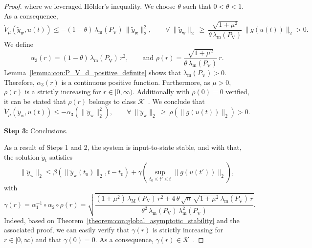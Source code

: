 \begin{proof}
    where we leveraged Hölder's inequality. We choose $\theta$ such that $0 < \theta < 1$.
    As a consequence,
    \begin{equation}
        \dot{V}_\mu(\tilde{y}_\mathrm{w}, u(t)) \leq -(1-\theta) \, \lambda_\mathrm{m}\left(P_{\dot{\mathrm{V}}} \right) \, \lVert \tilde{y}_\mathrm{w} \rVert_2^2, %
        \qquad
        \forall \: \lVert \tilde{y}_\mathrm{w} \rVert_2 \: \geq \: \frac{\sqrt{1+\mu^2}}{\theta \, \lambda_\mathrm{m}\left(P_{\dot{\mathrm{V}}} \right)} \, \lVert g(u(t)) \rVert_2  > 0.
    \end{equation}
    We define
    \begin{equation}
        \alpha_3(r) = (1-\theta) \, \lambda_\mathrm{m}\left(P_{\dot{\mathrm{V}}} \right) \, r^2,
        \qquad
        \text{and }
        \rho(r) = \frac{\sqrt{1+\mu^2}}{\theta \, \lambda_\mathrm{m}\left(P_{\dot{\mathrm{V}}} \right)} \, r.
    \end{equation}
    Lemma~\ref{lemma:con:P_V_d_positive_definite} shows that $\lambda_\mathrm{m}\left(P_{\dot{\mathrm{V}}} \right) > 0$. Therefore, $\alpha_3(r)$ is a continuous positive function. Furthermore, as $\mu > 0$, $\rho(r)$ is a strictly increasing for $r \in [0, \infty)$. Additionally with $\rho(0) = 0$ verified, it can be stated that $\rho(r)$ belongs to class $\mathcal{K}$~\citep{khalil2002nonlinear}.
    We conclude that
    \begin{equation}
        \dot{V}_\mu(\tilde{y}_\mathrm{w}, u(t)) \leq - \alpha_3 \left (\lVert \tilde{y}_\mathrm{w} \rVert_2^2 \right ),
        \qquad
        \forall \: \lVert \tilde{y}_\mathrm{w} \rVert_2 \: \geq \: \rho \left ( \lVert g(u(t)) \rVert_2 \right )  > 0.
    \end{equation}

    \textbf{Step 3:} Conclusions.

    As a result of Steps 1 and 2, the system is input-to-state stable, and with that, the solution $\tilde{y}_\mathrm{t}$ satisfies~\citep{khalil2002nonlinear}
    \begin{equation}
        \lVert \tilde{y}_\mathrm{w} \rVert_2 \leq \beta \left (\lVert \tilde{y}_\mathrm{w}(t_0) \rVert_2, t-t_0 \right ) + \gamma \left ( \sup_{t_0 \leq t' \leq t} \lVert g(u(t')) \rVert_2 \right ),
    \end{equation}
    with
    \begin{equation}
        \gamma(r) = \alpha_1^{-1} \circ \alpha_2 \circ \rho(r) = \sqrt{\frac{(1+\mu^2) \, \lambda_\mathrm{M}(P_\mathrm{V}) \, r^2 + 4 \, \theta \, \sqrt{n} \, \sqrt{1+\mu^2} \, \lambda_\mathrm{m}(P_{\dot{\mathrm{V}}}) \, r}{\theta^2 \, \lambda_\mathrm{m}(P_\mathrm{V}) \, \lambda_\mathrm{m}^2(P_{\dot{\mathrm{V}}})}}.
    \end{equation}
    Indeed, based on Theorem~\ref{theorem:con:global_asymptotic_stability} and the associated proof, we can easily verify that $\gamma(r)$ is strictly increasing for $r \in [0, \infty)$ and that $\gamma(0) = 0$. As a consequence, $\gamma(r) \in \mathcal{K}$~\citep{khalil2002nonlinear}.
\end{proof}